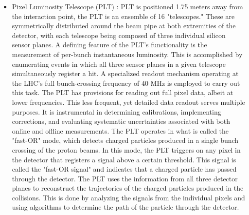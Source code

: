 \begin{itemize}
\item Pixel Luminosity Telescope (PLT) : PLT is positioned 1.75 meters away from the interaction point, the PLT is an ensemble of 16 "telescopes." These are symmetrically distributed around the beam pipe at both extremities of the detector, with each telescope being composed of three individual silicon sensor planes. A defining feature of the PLT's functionality is the measurement of per-bunch instantaneous luminosity. This is accomplished by enumerating events in which all three sensor planes in a given telescope simultaneously register a hit. A specialized readout mechanism operating at the LHC's full bunch-crossing frequency of 40 MHz is employed to carry out this task. The PLT has provisions for reading out full pixel data, albeit at lower frequencies. This less frequent, yet detailed data readout serves multiple purposes. It is instrumental in determining calibrations, implementing corrections, and evaluating systematic uncertainties associated with both online and offline measurements. The PLT operates in what is called the "fast-OR" mode, which detects charged particles produced in a single bunch crossing of the proton beams. In this mode, the PLT triggers on any pixel in the detector that registers a signal above a certain threshold. This signal is called the "fast-OR signal" and indicates that a charged particle has passed through the detector. The PLT uses the information from all three detector planes to reconstruct the trajectories of the charged particles produced in the collisions. This is done by analyzing the signals from the individual pixels and using algorithms to determine the path of the particle through the detector.

\end{itemize}
